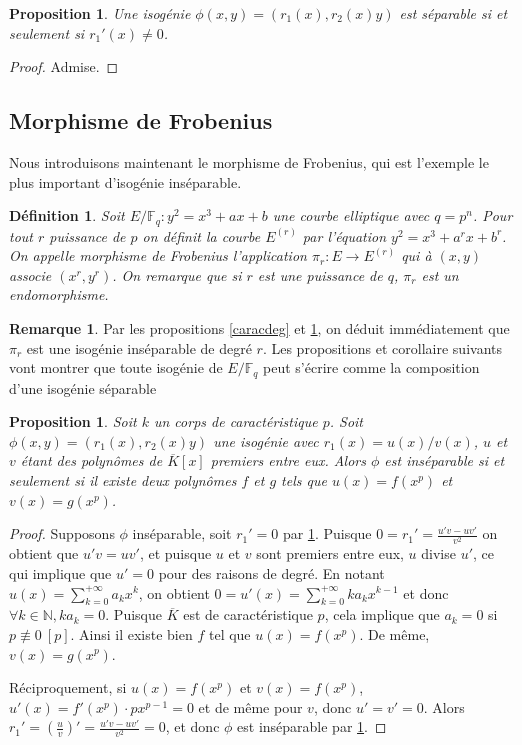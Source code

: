 \documentclass{article}
\theoremstyle{plain}%
\newtheorem{prop}[thm]{Proposition}
\newtheorem{deff}[thm]{Définition}
\theoremstyle{definition}%
\newtheorem{rem}[thm]{Remarque}
\newcommand{\F}{\mathbb{F}}
\newcommand{\N}{\mathbb{N}}
\begin{document}
\begin{prop}
  \label{caracsep}
  Une isogénie $\phi(x, y) = (r_1(x), r_2(x)y)$ est séparable si et seulement si $r_1'(x) \neq 0$.
\end{prop}

\begin{proof}
  Admise.
\end{proof}

\subsection{Morphisme de Frobenius}

Nous introduisons maintenant le morphisme de Frobenius, qui est l'exemple le plus important d'isogénie inséparable.

\begin{deff}
  Soit $E/\F_q : y^2 = x^3 + ax + b$ une courbe elliptique avec $q = p^n$. Pour tout $r$ puissance de $p$ on définit la courbe $E^{(r)}$ par l'équation $y^2 = x^3 + a^r x + b^r$. On appelle morphisme de Frobenius l'application $\pi_r : E \to E^{(r)}$ qui à $(x, y)$ associe $(x^r, y^r)$. On remarque que si $r$ est une puissance de $q$, $\pi_r$ est un endomorphisme.
\end{deff}


\begin{rem}
  \label{degpi}
  Par les propositions \ref{caracdeg} et \ref{caracsep}, on déduit immédiatement que $\pi_r$ est une isogénie inséparable de degré $r$. Les propositions et corollaire suivants vont montrer que toute isogénie de $E/\F_q$ peut s'écrire comme la composition d'une isogénie séparable 
\end{rem}



\begin{prop}
  Soit $k$ un corps de caractéristique $p$. Soit $\phi(x, y) = (r_1(x), r_2(x)y)$ une isogénie avec $r_1(x) = u(x)/v(x)$, $u$ et $v$ étant des polynômes de $\overline{K}[x]$ premiers entre eux. Alors $\phi$ est inséparable si et seulement si il existe deux polynômes $f$ et $g$ tels que $u(x) = f(x^p)$ et $v(x) = g(x^p)$.
\end{prop}


\begin{proof}
  Supposons $\phi$ inséparable, soit $r_1' = 0$ par \ref{caracsep}. Puisque $0 = r_1' = \frac{u'v -uv'}{v^2}$ on obtient que $u'v = uv'$, et puisque $u$ et $v$ sont premiers entre eux, $u$ divise $u'$, ce qui implique que $u' = 0$ pour des raisons de degré.  En notant $u(x) = \sum_{k=0}^{+\infty} a_kx^k$, on obtient $0 = u'(x) = \sum_{k=0}^{+\infty} ka_kx^{k-1}$ et donc $\forall k\in \N, ka_k = 0$. Puisque $\overline{K}$ est de caractéristique $p$, cela implique que $a_k = 0$ si $p\not\equiv 0\ [p]$. Ainsi il existe bien $f$ tel que $u(x) = f(x^p)$. De même, $v(x) = g(x^p)$. 

  Réciproquement, si $u(x) = f(x^p)$ et $v(x) = f(x^p)$, $u'(x) = f'(x^p)\cdot px^{p-1} = 0$ et de même pour $v$, donc $u' = v' = 0$. Alors $r_1' = (\frac{u}{v})' =  \frac{u'v -uv'}{v^2} = 0$, et donc $\phi$ est inséparable par \ref{caracsep}.
\end{proof}
\end{document}
